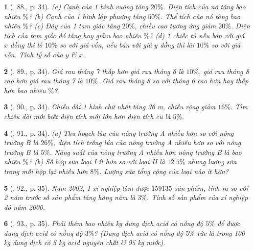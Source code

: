 \documentclass{article}
\newtheorem{baitoan}{}
\begin{document}
\begin{baitoan}[\cite{Binh_Toan_6_tap_2}, 88., p. 34]
	(a) Cạnh của 1 hình vuông tăng $20\%$. Diện tích của nó tăng bao nhiêu $\%$? (b) Cạnh của 1 hình lập phương tăng $50\%$. Thể tích của nó tăng bao nhiêu $\%$? (c) Đáy của 1 tam giác tăng $20\%$, chiều cao tương ứng giảm $20\%$. Diện tích của tam giác đó tăng hay giảm bao nhiêu $\%$? (d) 1 chiếc tủ nếu bán với giá $x$ đồng thì lỗ $10\%$ so với giá vốn, nếu bán với giá $y$ đồng thì lãi $10\%$ so với giá vốn. Tính tỷ số của $y$ \& $x$.
\end{baitoan}

\begin{baitoan}[\cite{Binh_Toan_6_tap_2}, 89., p. 34]
	Giá rau tháng 7 thấp hơn giá rau tháng 6 là $10\%$, giá rau tháng 8 cao hơn giá rau tháng 7 là $10\%$. Giá rau tháng 8 so với tháng 6 cao hơn hay thấp hơn bao nhiêu $\%$?
\end{baitoan}

\begin{baitoan}[\cite{Binh_Toan_6_tap_2}, 90., p. 34]
	Chiều dài 1 hình chữ nhật tăng {\rm36 m}, chiều rộng giảm $16\%$. Tìm chiều dài mới biết diện tích mới lớn hơn diện tích cũ là $5\%$.
\end{baitoan}

\begin{baitoan}[\cite{Binh_Toan_6_tap_2}, 91., p. 34]
	(a) Thu hoạch lúa của nông trường A nhiều hơn so với nông trường B là $26\%$, diện tích trồng lúa của nông trường A nhiều hơn so với nông trường B là $5\%$. Năng suất của nông trường A nhiều hơn nông trường B là bao nhiêu $\%$? (b) Số hộp sữa loại I ít hơn so với loại II là $12.5\%$ nhưng lượng sữa trong mỗi hộp lại nhiều hơn $8\%$. Lượng sữa tổng cộng của loại nào ít hơn?
\end{baitoan}

\begin{baitoan}[\cite{Binh_Toan_6_tap_2}, 92., p. 35]
	Năm 2002, 1 xí nghiệp làm được $159135$ sản phẩm, tính ra so với 2 năm trước số sản phẩm tăng hàng năm là $3\%$. Tính số sản phẩm của xí nghiệp đó năm 2000.
\end{baitoan}

\begin{baitoan}[\cite{Binh_Toan_6_tap_2}, 93., p. 35]
	Phải thêm bao nhiêu {\rm kg} dung dịch acid có nồng độ $5\%$ để được dung dịch acid có nồng độ $3\%$? (Dung dịch acid có nồng độ $5\%$ tức là trong {\rm100 kg} dung dịch có {\rm5 kg} acid nguyên chất \& {\rm95 kg} nước).
\end{baitoan}
\end{document}
